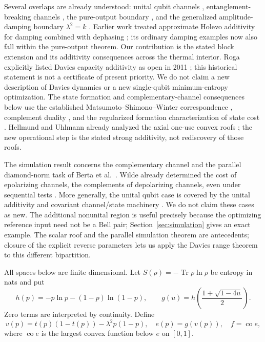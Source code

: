 \documentclass[11pt]{article}
\newcommand{\Tr}{\operatorname{Tr}}
\newcommand{\co}{\operatorname{co}}
\begin{document}
Several overlaps are already understood: unital qubit channels \cite{king}, entanglement-breaking channels \cite{shor}, the pure-output boundary \cite{tang}, and the generalized amplitude-damping boundary $\lambda^2=k$ \cite{openai,fang}. Earlier work treated approximate Holevo additivity for damping combined with dephasing \cite{leditzky}; its ordinary damping examples now also fall within the pure-output theorem. Our contribution is the stated block extension and its additivity consequences across the thermal interior. Roga explicitly listed Davies capacity additivity as open in 2011 \cite[Section 6, p.~78]{rogathesis}; this historical statement is not a certificate of present priority. We do not claim a new description of Davies dynamics or a new single-qubit minimum-entropy optimization. The state formation and complementary-channel consequences below use the established Matsumoto--Shimono--Winter correspondence \cite{msw}, complement duality \cite{conjugate}, and the regularized formation characterization of state cost \cite{hht}. Hellmund and Uhlmann already analyzed the axial one-use convex roofs \cite{hu}; the new operational step is the stated strong additivity, not rediscovery of those roofs.


The simulation result concerns the complementary channel and the parallel
diamond-norm task of Berta et al.\ \cite{bcbw}. Wilde already determined the
cost of epolarizing channels, the complements of depolarizing channels, even
under sequential tests \cite[Section IV.D]{wilde}. More generally, the unital
qubit case is covered by the unital additivity and covariant channel/state
machinery \cite{king,msw,wilde}. We do not claim these cases as new. The
additional nonunital region is useful precisely because the optimizing
reference input need not be a Bell pair; Section~\ref{sec:simulation} gives
an exact example. The scalar roof and the parallel simulation theorem are
antecedents; closure of the explicit reverse parameters lets us apply the
Davies range theorem to this different bipartition.

All spaces below are finite dimensional. Let $S(\rho)=-\Tr\rho\ln\rho$ be entropy in nats and put
\[
 h(p)=-p\ln p-(1-p)\ln(1-p),\qquad
 g(u)=h\left(\frac{1+\sqrt{1-4u}}2\right).
\]
Zero terms are interpreted by continuity. Define
\begin{equation}\label{eq:ef}
 v(p)=t(p)(1-t(p))-\lambda^2p(1-p),\quad
 e(p)=g(v(p)),\quad f=\co e,
\end{equation}
where $\co e$ is the largest convex function below $e$ on $[0,1]$.
\end{document}
